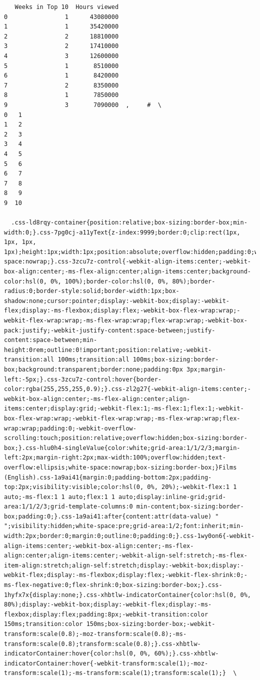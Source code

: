 \documentclass[
  letterpaper,
  DIV=11,
  numbers=noendperiod]{scrreprt}
\begin{document}
\begin{verbatim}
   Weeks in Top 10  Hours viewed  
0                1      43080000  
1                1      35420000  
2                2      18810000  
3                2      17410000  
4                3      12600000  
5                1       8510000  
6                1       8420000  
7                2       8350000  
8                1       7850000  
9                3       7090000  ,     #  \
0   1   
1   2   
2   3   
3   4   
4   5   
5   6   
6   7   
7   8   
8   9   
9  10   

  .css-ld8rqy-container{position:relative;box-sizing:border-box;min-width:0;}.css-7pg0cj-a11yText{z-index:9999;border:0;clip:rect(1px, 1px, 1px, 1px);height:1px;width:1px;position:absolute;overflow:hidden;padding:0;white-space:nowrap;}.css-3zcu7z-control{-webkit-align-items:center;-webkit-box-align:center;-ms-flex-align:center;align-items:center;background-color:hsl(0, 0%, 100%);border-color:hsl(0, 0%, 80%);border-radius:0;border-style:solid;border-width:1px;box-shadow:none;cursor:pointer;display:-webkit-box;display:-webkit-flex;display:-ms-flexbox;display:flex;-webkit-box-flex-wrap:wrap;-webkit-flex-wrap:wrap;-ms-flex-wrap:wrap;flex-wrap:wrap;-webkit-box-pack:justify;-webkit-justify-content:space-between;justify-content:space-between;min-height:0rem;outline:0!important;position:relative;-webkit-transition:all 100ms;transition:all 100ms;box-sizing:border-box;background:transparent;border:none;padding:0px 3px;margin-left:-5px;}.css-3zcu7z-control:hover{border-color:rgba(255,255,255,0.9);}.css-zl2g27{-webkit-align-items:center;-webkit-box-align:center;-ms-flex-align:center;align-items:center;display:grid;-webkit-flex:1;-ms-flex:1;flex:1;-webkit-box-flex-wrap:wrap;-webkit-flex-wrap:wrap;-ms-flex-wrap:wrap;flex-wrap:wrap;padding:0;-webkit-overflow-scrolling:touch;position:relative;overflow:hidden;box-sizing:border-box;}.css-hlu0h4-singleValue{color:white;grid-area:1/1/2/3;margin-left:2px;margin-right:2px;max-width:100%;overflow:hidden;text-overflow:ellipsis;white-space:nowrap;box-sizing:border-box;}Films (English).css-1a9ai41{margin:0;padding-bottom:2px;padding-top:2px;visibility:visible;color:hsl(0, 0%, 20%);-webkit-flex:1 1 auto;-ms-flex:1 1 auto;flex:1 1 auto;display:inline-grid;grid-area:1/1/2/3;grid-template-columns:0 min-content;box-sizing:border-box;padding:0;}.css-1a9ai41:after{content:attr(data-value) " ";visibility:hidden;white-space:pre;grid-area:1/2;font:inherit;min-width:2px;border:0;margin:0;outline:0;padding:0;}.css-1wy0on6{-webkit-align-items:center;-webkit-box-align:center;-ms-flex-align:center;align-items:center;-webkit-align-self:stretch;-ms-flex-item-align:stretch;align-self:stretch;display:-webkit-box;display:-webkit-flex;display:-ms-flexbox;display:flex;-webkit-flex-shrink:0;-ms-flex-negative:0;flex-shrink:0;box-sizing:border-box;}.css-1hyfx7x{display:none;}.css-xhbtlw-indicatorContainer{color:hsl(0, 0%, 80%);display:-webkit-box;display:-webkit-flex;display:-ms-flexbox;display:flex;padding:8px;-webkit-transition:color 150ms;transition:color 150ms;box-sizing:border-box;-webkit-transform:scale(0.8);-moz-transform:scale(0.8);-ms-transform:scale(0.8);transform:scale(0.8);}.css-xhbtlw-indicatorContainer:hover{color:hsl(0, 0%, 60%);}.css-xhbtlw-indicatorContainer:hover{-webkit-transform:scale(1);-moz-transform:scale(1);-ms-transform:scale(1);transform:scale(1);}  \

\end{verbatim}
\end{document}
